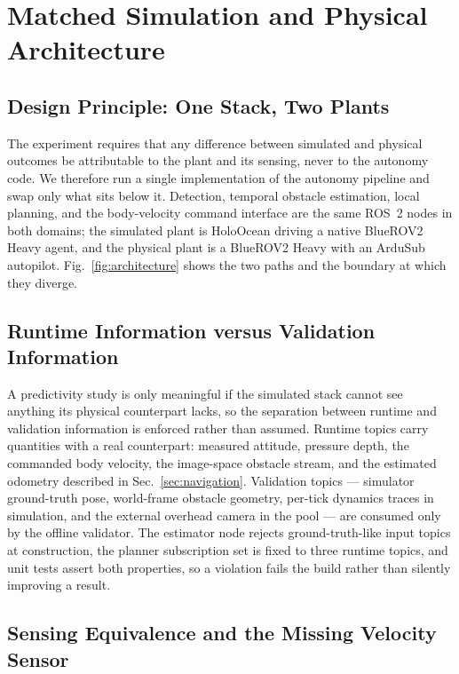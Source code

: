 \section{Matched Simulation and Physical Architecture}
\label{sec:system}

\subsection{Design Principle: One Stack, Two Plants}

The experiment requires that any difference between simulated and physical
outcomes be attributable to the plant and its sensing, never to the autonomy
code. We therefore run a single implementation of the autonomy pipeline and
swap only what sits below it. Detection, temporal obstacle estimation, local
planning, and the body-velocity command interface are the same ROS~2 nodes
in both domains; the simulated plant is HoloOcean driving a native BlueROV2
Heavy agent, and the physical plant is a BlueROV2 Heavy with an ArduSub
autopilot. Fig.~\ref{fig:architecture} shows the two paths and the boundary
at which they diverge.



\subsection{Runtime Information versus Validation Information}

A predictivity study is only meaningful if the simulated stack cannot see
anything its physical counterpart lacks, so the separation between runtime
and validation information is enforced rather than assumed. Runtime topics
carry quantities with a real counterpart: measured attitude, pressure depth,
the commanded body velocity, the image-space obstacle stream, and the
estimated odometry described in Sec.~\ref{sec:navigation}. Validation topics
--- simulator ground-truth pose, world-frame obstacle geometry, per-tick
dynamics traces in simulation, and the external overhead camera in the pool
--- are consumed only by the offline validator. The estimator node rejects
ground-truth-like input topics at construction, the planner subscription set
is fixed to three runtime topics, and unit tests assert both properties, so
a violation fails the build rather than silently improving a result.

\subsection{Sensing Equivalence and the Missing Velocity Sensor}

